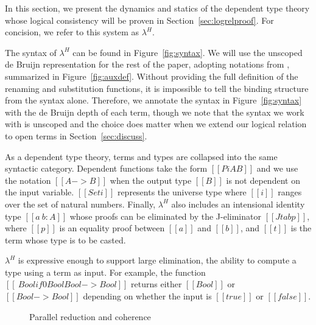 \documentclass[acmsmall]{acmart}
\newcommand{\lang}{$\lambda^H$\xspace}
\begin{document}


In this section, we present the dynamics and statics of the
dependent type theory whose logical consistency will be proven in
Section~\ref{sec:logrelproof}. For concision, we refer to this system
as \lang.

The syntax of \lang can be found in Figure~\ref{fig:syntax}. We will use
the unscoped de Bruijn representation for the rest of the paper,
adopting notations from \citet{autosubst2}, summarized in Figure~\ref{fig:auxdef}.
Without providing
the full definition of the renaming and substitution functions, it is
impossible to tell the binding structure from the syntax
alone. Therefore, we annotate the syntax in Figure~\ref{fig:syntax}
with the de Bruijn depth of each term, though we note that the
syntax we work with is unscoped and the choice does matter when
we extend our logical relation to open terms in Section~\ref{sec:discuss}.

As a
dependent type theory, terms and types are collapsed into the same
syntactic category. Dependent functions take the form $[[Pi A B]]$ and
we use the notation $[[A -> B]]$ when the output type $[[B]]$ is not
dependent on the input variable. $[[Set i]]$ represents the universe
type where $[[i]]$ ranges over the set of natural numbers.
 Finally,
\lang also includes an intensional identity type $[[a ~ b : A]]$ whose
proofs can be eliminated by the J-eliminator $[[J t a b p]]$, where
$[[p]]$ is an equality proof between $[[a]]$ and $[[b]]$, and $[[t]]$
is the term whose type is to be casted.

\lang is expressive enough to support large
elimination, the ability to compute a type using a term as input. For
example, the function $[[\ Bool if 0 Bool Bool -> Bool]]$ returns
either $[[Bool]]$ or $[[Bool -> Bool]]$ depending on whether the input
is $[[true]]$ or $[[false]]$.

\begin{figure}[h]
\begin{minipage}{0.9\textwidth}
\end{minipage}
\caption{Parallel reduction and coherence}
\label{fig:par}
\end{figure}
\end{document}
